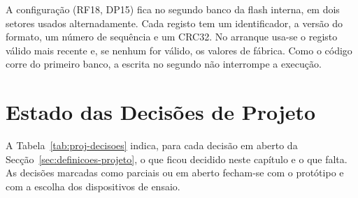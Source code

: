 A configuração (RF18, DP15) fica no segundo banco da flash interna, em
dois setores usados alternadamente. Cada registo tem um identificador,
a versão do formato, um número de sequência e um CRC32. No arranque
usa-se o registo válido mais recente e, se nenhum for válido, os valores
de fábrica. Como o código corre do primeiro banco, a escrita no segundo
não interrompe a execução.

\section{Estado das Decisões de Projeto}
\label{sec:proj-decisoes}

A Tabela~\ref{tab:proj-decisoes} indica, para cada decisão em aberto da
Secção~\ref{sec:definicoes-projeto}, o que ficou decidido neste capítulo
e o que falta. As decisões marcadas como parciais ou em aberto fecham-se
com o protótipo e com a escolha dos dispositivos de ensaio.

